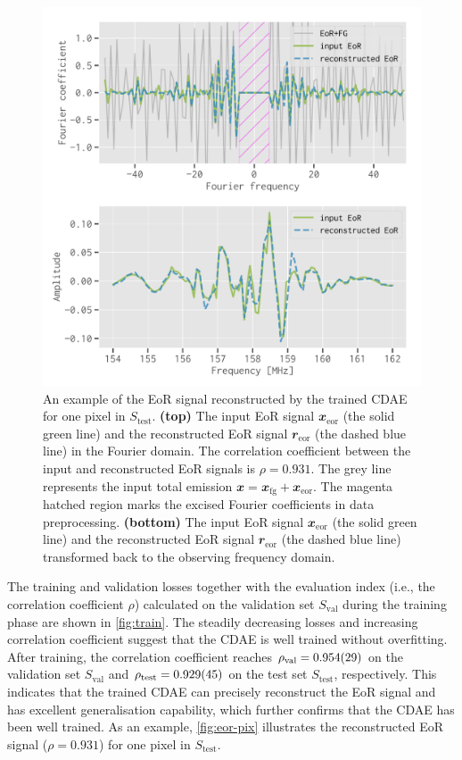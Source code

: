 \documentclass[fleqn,usenatbib]{mnras}
\newlength{\myfigwidth}
\newcommand{\R}[1]{\mathrm{#1}}
\newcommand{\B}[1]{\mathbfit{#1}}
\newcommand{\editwip}[1]{{\leavevmode\color{magenta}#1}}
\begin{document}
\begin{figure}
  \centering
  \includegraphics[width=\myfigwidth]{eor-result}
  \caption{\label{fig:eor-pix}%
    An example of the EoR signal reconstructed by the trained CDAE for
    one pixel \editwip{in $S_{\R{test}}$}.
    \textbf{(top)} The input EoR signal $\B{x}_{\R{eor}}$ (the solid
    green line) and the reconstructed EoR signal $\B{r}_{\R{eor}}$
    (the dashed blue line) in the Fourier domain.
    \editwip{The correlation coefficient between the input and
      reconstructed EoR signals is $\rho = 0.931$.}
    The grey line represents the input total emission
    $\B{x} = \B{x}_{\R{fg}} + \B{x}_{\R{eor}}$.
    The magenta hatched region marks the excised Fourier coefficients
    in data preprocessing.
    \textbf{(bottom)} The input EoR signal $\B{x}_{\R{eor}}$ (the solid
    green line) and the reconstructed EoR signal $\B{r}_{\R{eor}}$
    (the dashed blue line) transformed back to the observing frequency
    domain.
  }
\end{figure}

The training and validation losses together with the evaluation index
(i.e., the correlation coefficient $\rho$) calculated on the validation set
$S_{\R{val}}$ during the training phase are shown in \autoref{fig:train}.
The steadily decreasing losses and increasing correlation coefficient
suggest that the CDAE is well trained without overfitting.
\editwip{%
After training, the correlation coefficient reaches
$\rho_{\R{val}} = \num{0.954 +- 0.029}$ on the validation set
$S_{\R{val}}$ and $\rho_{\R{test}} = \num{0.929 +- 0.045}$ on the test set
$S_{\R{test}}$, respectively.
This indicates that the trained CDAE can precisely reconstruct the EoR
signal and has excellent generalisation capability, which further confirms
that the CDAE has been well trained.} %
As an example, \autoref{fig:eor-pix} illustrates the reconstructed EoR
signal (\editwip{$\rho = 0.931$}) for one pixel \editwip{in $S_{\R{test}}$}.
\end{document}
